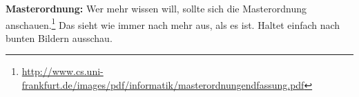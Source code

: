 \textbf{Masterordnung:} Wer mehr wissen will, sollte sich die Masterordnung anschauen.\footnote{\url{http://www.cs.uni-frankfurt.de/images/pdf/informatik/masterordnungendfassung.pdf}} Das sieht wie immer nach mehr aus, als es ist. Haltet einfach nach bunten Bildern ausschau.

\spaltenende
